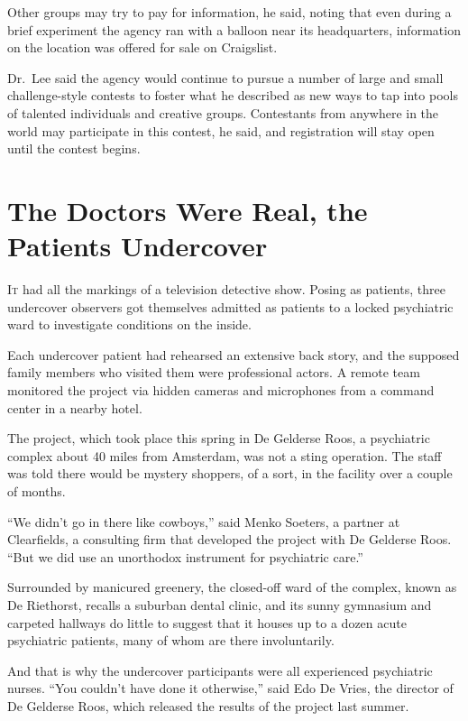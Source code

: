 ﻿\documentclass[12pt]{article}
\begin{document}
Other groups may try to pay for information, he said, noting that even during a brief experiment the
agency ran with a balloon near its headquarters, information on the location was offered for sale on
Craigslist.

Dr.~Lee said the agency would continue to pursue a number of large and small challenge-style
contests to foster what he described as new ways to tap into pools of talented individuals and
creative groups. Contestants from anywhere in the world may participate in this contest, he said,
and registration will stay open until the contest begins.

\section{The Doctors Were Real, the Patients Undercover}

\lettrine{I}{t} had all the markings of a television detective show. Posing
as patients, three undercover observers got themselves admitted as patients to a locked psychiatric
ward to investigate conditions on the inside.

Each undercover patient had rehearsed an extensive back story, and the supposed family members who
visited them were professional actors. A remote team monitored the project via hidden cameras and
microphones from a command center in a nearby hotel.

The project, which took place this spring in De Gelderse Roos, a psychiatric complex about 40 miles
from Amsterdam, was not a sting operation. The staff was told there would be mystery shoppers, of a
sort, in the facility over a couple of months.

``We didn't go in there like cowboys,'' said Menko Soeters, a partner at Clearfields, a consulting
firm that developed the project with De Gelderse Roos. ``But we did use an unorthodox instrument for
psychiatric care.''

Surrounded by manicured greenery, the closed-off ward of the complex, known as De Riethorst, recalls
a suburban dental clinic, and its sunny gymnasium and carpeted hallways do little to suggest that it
houses up to a dozen acute psychiatric patients, many of whom are there involuntarily.

And that is why the undercover participants were all experienced psychiatric nurses. ``You couldn't
have done it otherwise,'' said Edo De Vries, the director of De Gelderse Roos, which released the
results of the project last summer.
\end{document}
